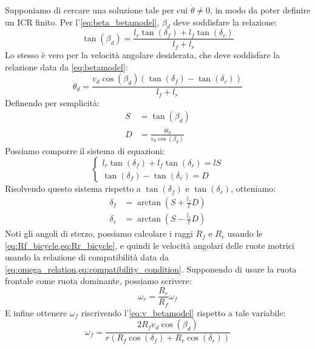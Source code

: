 Supponiamo di cercare una soluzione tale per cui $\dot{\theta}\neq0$, in modo da poter definire un ICR finito. Per l'\cref{eq:beta_betamodel}, $\beta_d$ deve soddisfare la relazione:
\begin{equation}\label{eq:beta_relation}
    \tan(\beta_d) = \frac{l_r \tan(\delta_f) + l_f \tan(\delta_r)}{l_f + l_r}
\end{equation}
Lo stesso è vero per la velocità angolare desiderata, che deve soddisfare la relazione data da \cref{eq:betamodel}:
\begin{equation}\label{eq:thetad_relation}
    \dot{\theta}_d = \frac{v_d \cos(\beta_d) (\tan(\delta_f) - \tan(\delta_r))}{l_f + l_r}
\end{equation}
Definendo per semplicità:
\begin{align}
    S & = \tan(\beta_d) \label{eq:S}                             \\
    D & = \frac{l\dot{\theta}_d}{v_d \cos(\beta_d)} \label{eq:D}
\end{align}
Possiamo comporre il sistema di equazioni:
\begin{equation}\label{eq:inverse_kinematics_system_betamodel}
    \begin{cases}
        l_r \tan(\delta_f) + l_f \tan(\delta_r) = lS \\
        \tan(\delta_f) - \tan(\delta_r) = D
    \end{cases}
\end{equation}
Risolvendo questo sistema rispetto a $\tan(\delta_f)$ e $\tan(\delta_r)$, otteniamo:
\begin{align}
    \delta_f & = \arctan\left(S + \frac{l_f}{l} D\right) \label{eq:deltaf_inverse_betamodel} \\
    \delta_r & = \arctan\left(S - \frac{l_r}{l} D\right) \label{eq:deltar_inverse_betamodel}
\end{align}
Noti gli angoli di sterzo, possiamo calcolare i raggi $R_f$ e $R_r$ usando le \cref{eq:Rf_bicycle,eq:Rr_bicycle}, e quindi le velocità angolari delle ruote motrici usando la relazione di compatibilità data da \cref{eq:omega_relation,eq:compatibility_condition}. Supponendo di usare la ruota frontale come ruota dominante, possiamo scrivere:
\begin{equation}\label{eq:omegar_inverse_betamodel}
    \omega_r = \frac{R_r}{R_f} \omega_f
\end{equation}
E infine ottenere $\omega_f$ riscrivendo l'\cref{eq:v_betamodel} rispetto a tale variabile:
\begin{equation}\label{eq:omegaf_inverse_betamodel}
    \omega_f=\frac{2 R_{f} v_{d} \cos{\left(\beta_{d} \right)}}{r \left(R_{f} \cos{\left(\delta_{f}{} \right)} + R_{r} \cos{\left(\delta_{r}{} \right)}\right)}
\end{equation}
